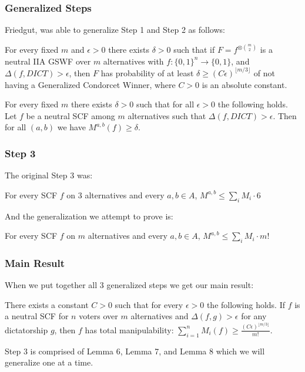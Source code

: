 \documentclass[aspectratio=169]{beamer}
\begin{document}
		\begin{frame}
			\frametitle{Generalized Steps}

			Friedgut, was able to generalize Step 1 and Step 2 as follows:

			\begin{lemma}
				For every fixed $m$ and $\epsilon > 0$ there exists $\delta > 0$ such that if $F = f^{\otimes \binom{m}{2}}$ is a neutral IIA GSWF over $m$ alternatives with $f : \{0,1\}^n \rightarrow \{0,1\}$, and $\Delta(f, DICT) > \epsilon$, then $F$ has probability of at least $\delta \ge (C\epsilon)^{\lfloor m/3 \rfloor}$ of not having a Generalized Condorcet Winner, where $C > 0$ is an absolute constant.
			\end{lemma}

			\begin{lemma}
				For every fixed $m$ there exists $\delta > 0$ such that for all $\epsilon > 0$ the following holds. Let $f$ be a neutral SCF among $m$ alternatives such that $\Delta(f, DICT) > \epsilon$. Then for all $(a,b)$ we have $M^{a,b}(f) \ge \delta$.
			\end{lemma}

		\end{frame}

		\begin{frame}
			\frametitle{Step 3}

			The original Step 3 was:

			\begin{lemma}
				For every SCF $f$ on $3$ alternatives and every $a,b \in A$, $M^{a,b} \le \sum_i M_i \cdot 6$
			\end{lemma}

			And the generalization we attempt to prove is:

			\begin{lemma}
				For every SCF $f$ on $m$ alternatives and every $a,b \in A$, $M^{a,b} \le \sum_i M_i \cdot m!$
			\end{lemma}
		\end{frame}

		\begin{frame}
			\frametitle{Main Result}

			When we put together all 3 generalized steps we get our main result:

			\begin{theorem}
				There exists a constant $C > 0$ such that for every $\epsilon > 0$ the following holds. If $f$ is a neutral SCF for $n$ voters over $m$ alternatives and $\Delta(f, g) > \epsilon$ for any dictatorship $g$, then $f$ has total manipulability: $\sum^n_{i=1} M_i(f) \ge \frac{(C\epsilon)^{\lfloor m/3 \rfloor}}{m!}$.
			\end{theorem}

			Step 3 is comprised of Lemma 6, Lemma 7, and Lemma 8 which we will generalize one at a time.
		\end{frame}
\end{document}
